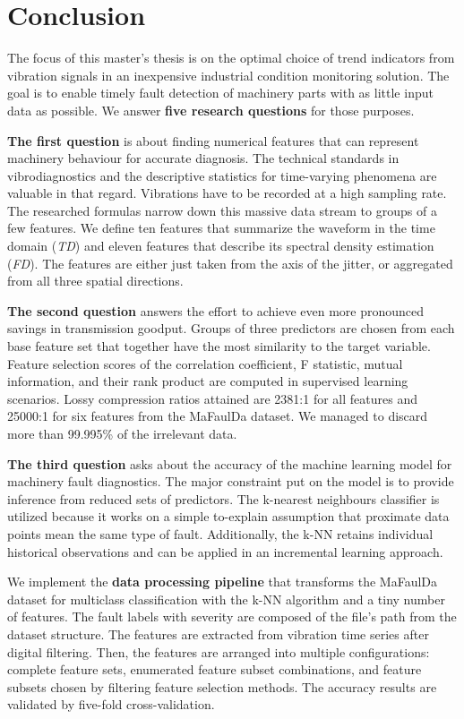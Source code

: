 \chapter{Conclusion} \label{section:conclusion}
The focus of this master's thesis is on the optimal choice of trend indicators from vibration signals in an inexpensive industrial condition monitoring solution. The goal is to enable timely fault detection of machinery parts with as little input data as possible. We answer \textbf{five research questions} for those purposes.

\textbf{The first question} is about finding numerical features that can represent machinery behaviour for accurate diagnosis. The technical standards in vibrodiagnostics and the descriptive statistics for time-varying phenomena are valuable in that regard. Vibrations have to be recorded at a high sampling rate. The researched formulas narrow down this massive data stream to groups of a few features. We define ten features that summarize the waveform in the time domain (\emph{TD}) and eleven features that describe its spectral density estimation (\emph{FD}). The features are either just taken from the axis of the jitter, or aggregated from all three spatial directions.

\textbf{The second question} answers the effort to achieve even more pronounced savings in transmission goodput. Groups of three predictors are chosen from each base feature set that together have the most similarity to the target variable. Feature selection scores of the correlation coefficient, F statistic, mutual information, and their rank product are computed in supervised learning scenarios. Lossy compression ratios attained are 2381:1 for all features and 25000:1 for six features from the MaFaulDa dataset. We managed to discard more than 99.995\% of the irrelevant data.

\textbf{The third question} asks about the accuracy of the machine learning model for machinery fault diagnostics. The major constraint put on the model is to provide inference from reduced sets of predictors. The k-nearest neighbours classifier is utilized because it works on a simple to-explain assumption that proximate data points mean the same type of fault. Additionally, the k-NN retains individual historical observations and can be applied in an incremental learning approach.

We implement the \textbf{data processing pipeline} that transforms the MaFaulDa dataset for multiclass classification with the k-NN algorithm and a tiny number of features. The fault labels with severity are composed of the file's path from the dataset structure. The features are extracted from vibration time series after digital filtering. Then, the features are arranged into multiple configurations: complete feature sets, enumerated feature subset combinations, and feature subsets chosen by filtering feature selection methods. The accuracy results are validated by five-fold cross-validation.

